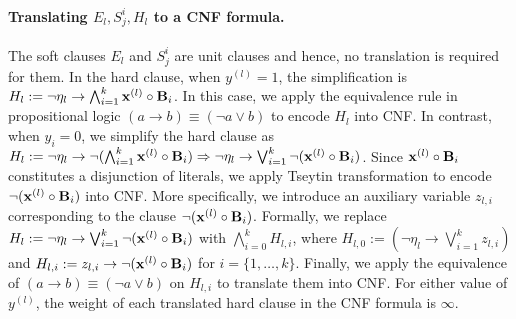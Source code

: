 \paragraph{Translating $ E_l, S^i_j, H_l $ to a CNF formula.} 
The soft clauses $ E_l $ and $ S_j^i $ are unit clauses and hence, no translation is required for them.  In the hard clause, when $ y^{(l)}=1 $, the simplification is $ H_l:= \neg \eta_l \rightarrow \bigwedge_{i=1}^k {\mathbf{x}^{(l)}} \circ {\ensuremath{\mathbf{B}}_{i}}  $. In this case, we apply the equivalence rule in propositional logic $ (a \rightarrow b) \equiv (\neg a \vee b) $  to encode $ H_l $ into  CNF. In contrast, when $ y_i=0 $, we simplify the hard clause as $ H_l:= \neg \eta_l \rightarrow \neg (\bigwedge_{i=1}^k {\mathbf{x}^{(l)}} \circ {\ensuremath{\mathbf{B}}_{i}}) \Rightarrow  \neg \eta_l \rightarrow \bigvee_{i=1}^k \neg({\mathbf{x}^{(l)}} \circ {\ensuremath{\mathbf{B}}_{i}})$. Since $ \mathbf{x}^{(l)} \circ \mathbf{B}_{i} $ constitutes a disjunction of literals, we apply Tseytin transformation to encode  $ \neg (\mathbf{x}^{(l)} \circ \mathbf{B}_{i}) $ into CNF. More specifically, we introduce an auxiliary variable $ z_{l,i} $ corresponding to the clause $ \neg ({\mathbf{x}^{(l)}} \circ {\ensuremath{\mathbf{B}}_{i}}) $. Formally, we replace $ H_l := \neg \eta_l \rightarrow  \bigvee_{i=1}^k \neg ({\mathbf{x}^{(l)}} \circ {\ensuremath{\mathbf{B}}_{i}}) $ with   $ \bigwedge_{i=0}^k H_{l,i} $,  where $ H_{l,0}:= (\neg \eta_l \rightarrow  \bigvee_{i=1}^k  z_{l,i}) $  and  $  H_{l,i}:= z_{l,i} \rightarrow  \neg({\mathbf{x}^{(l)}} \circ {\ensuremath{\mathbf{B}}_{i}})  $ for $ i=\{1,\dots,k\} $. Finally, we  apply the equivalence of $ (a \rightarrow b) \equiv (\neg a \vee b) $ on $ H_{l,i} $ to translate them into CNF. For either value of $ y^{(l)} $, the weight of each translated hard clause in the CNF formula is $ \infty $.







